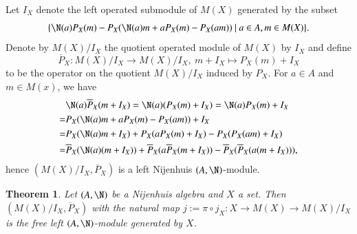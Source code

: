 \documentclass[12pt]{amsart}
\newtheorem{theorem}{Theorem}[section]
\theoremstyle{definition}
\begin{document}

Let $I_X$ denote the left operated submodule of $M(X)$ generated by the subset
$$
\{ \N(a)P_X(m) - P_X(\N(a)m+ aP_X(m)-P_X(am))~|~a\in A, m \in M(X)\}.
$$
Denote by $M(X)/I_X$ the quotient operated module of $M(X)$ by $I_X$ and define
$$\overline{P}_X: M(X)/I_X \to M(X)/I_X,\ m+ I_X \mapsto P_X(m)+I_X$$
to be the operator on the quotient $M(X)/I_X$ induced by $P_X$. For $a \in A$ and $m \in M(x)$, we have
\begin{align*}
& \N(a) \overline{P}_X( m+ I_X)=\N(a)(P_X(m)+I_X)=\N(a)P_X(m)+I_X\\
=& P_X(\N(a)m+ a P_X(m)-P_X(am))+I_X\\
=& P_X(\N(a)m+ I_X)+ P_X(a P_X(m)+I_X)-P_X(P_X(am)+I_X)\\
=& \overline{P}_X(\N(a)(m+I_X))+\overline{P}_X(a \overline{P}_X(m+I_X))-\overline{P}_X (\overline{P}_X(a(m+I_X)) ),
\end{align*}
hence $(M(X)/I_X, \overline{P}_X)$ is a left Nijenhuis $(A,\N)$-module.

\begin{theorem}
Let $(A,\N)$ be a Nijenhuis algebra and $X$ a set.
Then $(M(X)/I_X, \overline{P}_X)$ with the natural map $j:= \pi\circ j_X: X \to M(X) \to M(X)/I_X $ is the free left $(A,\N)$-module generated by $X$.
\end{theorem}
\end{document}
